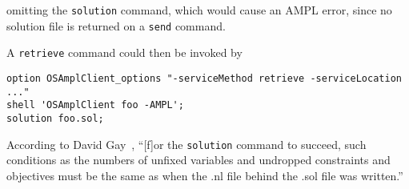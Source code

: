 \noindent omitting the {\tt solution} command, which would cause an AMPL error, since no solution file is returned on a {\tt send} command.

A {\tt retrieve} command could then be invoked by

\begin{verbatim}
option OSAmplClient_options "-serviceMethod retrieve -serviceLocation ..."
shell 'OSAmplClient foo -AMPL';
solution foo.sol;
\end{verbatim}
 

According to David Gay~\cite{dmg-25Sep2012}, ``[f]or the {\tt solution} command to succeed,
such conditions as the numbers of unfixed variables and undropped constraints
and objectives must be the same as when the .nl file behind the .sol file
was written.''
\fi


